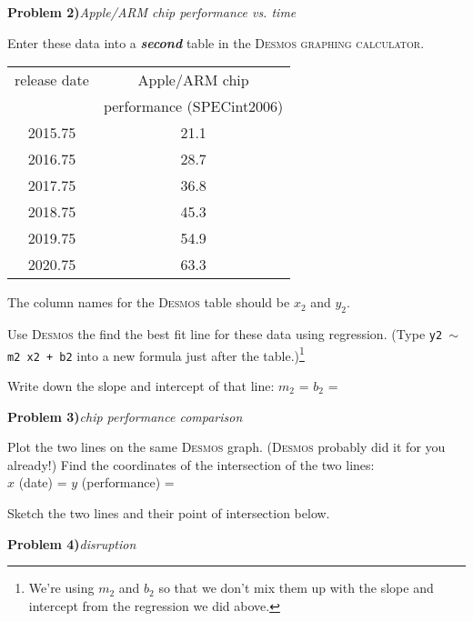 \documentclass[10pt,letterpaper]{memoir}
\begin{document}
\vspace{3em}
{\Large\bfseries Problem 2)}{\itshape Apple/ARM chip performance vs. time}

Enter these data into a {\bfseries\itshape second}
table in the {\scshape Desmos graphing calculator}.
\begin{center}
    \begin{tabular}{cc}
        \toprule
            release date & Apple/ARM chip\\
            & performance (SPECint2006) \\
        \midrule
            2015.75 & 21.1 \\
            2016.75 & 28.7 \\
            2017.75 & 36.8 \\
            2018.75 & 45.3 \\
            2019.75 & 54.9 \\
            2020.75 & 63.3 \\
        \bottomrule
    \end{tabular}
\end{center}
The column names for the {\scshape Desmos} table should be $x_2$ and $y_2$.

Use {\scshape Desmos} the find the best fit line for these data using regression.
(Type \texttt{y2 $\sim$ m2 x2 + b2} into a new formula just after the table.)\footnote{
    We're using $m_2$ and $b_2$ so that we don't mix them up with the slope and intercept 
    from the regression we did above.
}

Write down the slope and intercept of that line:\quad
$m_2$ = \gap{\phantom{99.999}}\qquad$b_2$ = \gap{\phantom{99.999}}



\newpage
{\Large\bfseries Problem 3)}{\itshape chip performance comparison}

Plot the two lines on the same {\scshape Desmos} graph.
({\scshape Desmos} probably did it for you already!)
Find the coordinates of the intersection of the two lines:\\[1.5em]
$x$ (date) = \gap{\phantom{9999.999}}\qquad$y$ (performance) = \gap{\phantom{99.99}}

Sketch the two lines and their point of intersection below.
\vspace{2in}




\vspace{3em}
{\Large\bfseries Problem 4)}{\itshape disruption}
\end{document}
